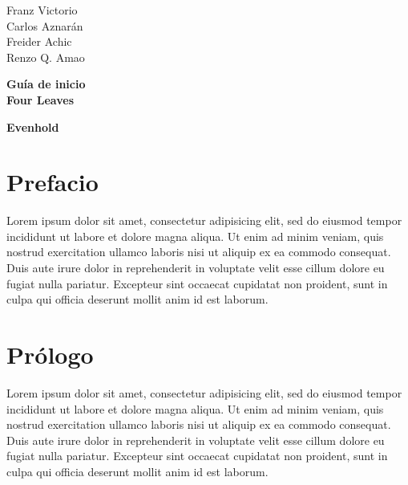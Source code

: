 \documentclass[11pt, oneside]{book}
\begin{document}
\begin{titlepage}
\raggedleft %
\vspace*{\baselineskip} %

{\Large Franz Victorio \\ Carlos Aznarán \\ Freider Achic \\ Renzo Q. Amao \\ } \vspace*{0.167\textheight}


\textbf{\LARGE  Guía de inicio }\\[\baselineskip]

{{\Huge \bf Four Leaves}}\\[\baselineskip]

{\large \bf {}}

\vfill %

{\large\bf Evenhold }
\vspace*{3\baselineskip}

\end{titlepage}
\tableofcontents

\chapter*{Prefacio}
Lorem ipsum dolor sit amet, consectetur adipisicing elit, sed do eiusmod tempor incididunt ut labore et dolore magna aliqua. Ut enim ad minim veniam, quis nostrud exercitation ullamco laboris nisi ut aliquip ex ea commodo consequat. Duis aute irure dolor in reprehenderit in voluptate velit esse cillum dolore eu fugiat nulla pariatur. Excepteur sint occaecat cupidatat non proident, sunt in culpa qui officia deserunt mollit anim id est laborum.
\chapter*{Prólogo}
Lorem ipsum dolor sit amet, consectetur adipisicing elit, sed do eiusmod tempor incididunt ut labore et dolore magna aliqua. Ut enim ad minim veniam, quis nostrud exercitation ullamco laboris nisi ut aliquip ex ea commodo consequat. Duis aute irure dolor in reprehenderit in voluptate velit esse cillum dolore eu fugiat nulla pariatur. Excepteur sint occaecat cupidatat non proident, sunt in culpa qui officia deserunt mollit anim id est laborum.
\end{document}
